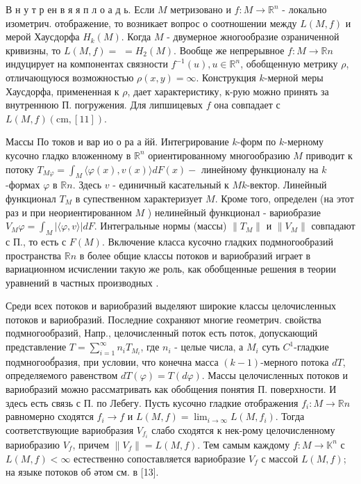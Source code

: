 \documentclass[10pt]{article}
\begin{document}
В н у т р ен в я я п л о а д ь. Если $M$ метризовано и $f: M \rightarrow \mathbb{R}^{n}$ - локально изометрич. отображение, то возникает вопрос о соотношении между $L(M, f)$ и мерой Хаусдорфа $H_{k}(M)$. Когда $M$ - двумерное жногообразие озраниченной кривизны, то $L(M, f)=$ $=H_{2}(M)$. Вообще же непрерывное $f: M \rightarrow \mathbb{R} n$ индуцирует на компонентах связности $f^{-1}(u), u \in \mathbb{R}^{n}$, обобщенную метрику $\rho$, отличающуюся возможностью $\rho(x, y)=\infty$. Конструкция $k$-мерной меры Хаусдорфа, примененная к $\rho$, дает характеристику, к-рую можно принять за внутреннюю П. погружения. Для липшицевых $f$ она совпадает с $L(M, f)(\mathrm{cm},[11])$.



Массы По токов и вар ио о ра а йй. Интегрирование $k$-форм по $k$-мерному кусочно гладко вложенному в $\mathbb{R}^{n}$ ориентированному многообразию $M$ приводит к потоку $T_{M \varphi}=\int_{M}\langle\varphi(x), v(x)\rangle d F(x)-$ линейному функционалу на $k$-формах $\varphi$ в $\mathbb{R} n$. Здесь $v$ - единичный касательный к $M k$-вектор. Линейный функционал $T_{M}$ в супественном характеризует $M$. Кроме того, определен (на этот раз и при неориентированном $M$ ) нелинейный функционал - вариобразие $V_{M} \varphi=\int_{M}|\langle\varphi, v\rangle| d F$. Интегральные нормы (массы) $\left\|T_{M}\right\|$ и $\left\|V_{M}\right\|$ совпадают с П., то есть с $F(M)$. Включение класса кусочно гладких подмногообразий пространства $\mathbb{R} n$ в более общие классы потоков и вариобразий играет в вариационном исчислении такую же роль, как обобщенные решения в теории уравнений в частных производных .



Среди всех потоков и вариобразий выделяют широкие классы целочисленных потоков и вариобразий. Последние сохраняют многие геометрич. свойства подмногообразий, Напр., целочисленный поток есть поток, допускающий представление $T=\sum_{i=1}^{\infty} n_{i} T_{M_{i}}$, где $n_{i}$ - целые числа, а $M_{i}$ суть $C^{1}$-гладкие подмногооб́разия, при условии, что конечна масса $(k-1)$-мерного потока $d T$, определяемого равенством $d T(\varphi)=T(d \varphi)$. Массы целочисленных потоков и вариобразий можно рассматривать как обобщения понятия П. поверхности. И здесь есть связь с П. по Лебегу. Пусть кусочно гладкие отображения $f_{i}: M \rightarrow \mathbb{R} n$ равномерно сходятся $f_{i} \rightarrow f$ и $L(M, f)=\lim _{i \rightarrow \infty} L\left(M, f_{i}\right)$. Тогда соответствующие вариобразия $V_{f_{i}}$ слабо сходятся к нек-рому целочисленному вариобразию $V_{f}$, причем $\left\|V_{f}\right\|=L(M, f)$. Тем самым каждому $f: M \rightarrow \mathbb{K}^{n}$ с $L(M, f)<\infty$ естественно сопоставляется вариобразие $V_{f}$ с массой $L(M, f)$; на языке потоков об әтом см. в [13].
\end{document}
